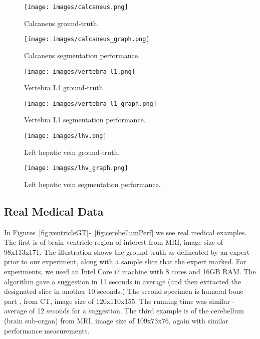 
\clearpage
\begin{figure}[t] 
	\centering
  \texttt{[image: images/calcaneus.png]}
  \caption[Calcaneus Ground-Truth]{
  Calcaneus ground-truth.
  }\label{fig:calcaneusGT}  
\end{figure}
\begin{figure}[b]
	\centering
  \texttt{[image: images/calcaneus\_graph.png]}
  \caption[Calcaneus Segmentation Performance]{
  Calcaneus segmentation performance.
  }\label{fig:calcaneusPerf}  
\end{figure}
\clearpage

\clearpage
\begin{figure}[t] 
	\centering
  \texttt{[image: images/vertebra\_l1.png]}
  \caption[Vertebra L1 Ground-Truth]{
  Vertebra L1 ground-truth.
  }\label{fig:vertebraL1GT}  
\end{figure}
\begin{figure}[b]
	\centering
  \texttt{[image: images/vertebra\_l1\_graph.png]}
  \caption[Vertebra L1 Segmentation Performance]{
  Vertebra L1 segmentation performance.
  }\label{fig:vertebraL1Perf}  
\end{figure}
\clearpage

\clearpage
\begin{figure}[t] 
	\centering
  \texttt{[image: images/lhv.png]}
  \caption[Left Hepatic Vein Ground-Truth]{
  Left hepatic vein ground-truth.
  }\label{fig:LhvGT}  
\end{figure}
\begin{figure}[b]
	\centering
  \texttt{[image: images/lhv\_graph.png]}
  \caption[Left Hepatic Vein Segmentation Performance]{
  Left hepatic vein segmentation performance.
  }\label{fig:LhvPerf}  
\end{figure}
\clearpage

\subsection{Real Medical Data}

In Figures~\ref{fig:ventricleGT}-~\ref{fig:cerebellumPerf} we see real medical examples.
The first is of brain ventricle region of interest from MRI, image size of 98x113x171.
The illustration shows the ground-truth as delineated by an expert prior to our experiment, along with a sample slice that the expert marked.
For experiments, we used an Intel Core i7 machine with 8 cores and 16GB RAM.
The algorithm gave a suggestion in 11 seconds in average (and then extracted the designated slice in another 10 seconds.)
The second specimen is humeral bone part \cite{humeral98}, from CT, image size of 120x110x155.
The running time was similar - average of 12 seconds for a suggestion.
The third example is of the cerebellum (brain sub-organ) from MRI, image size of 109x73x76, again with similar performance measurements.

